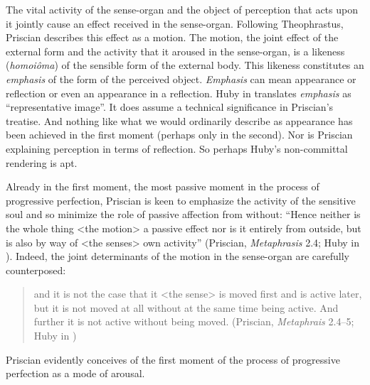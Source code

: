\documentclass[12pt]{article}
\begin{document}
The vital activity of the sense-organ and the object of perception that acts upon it jointly cause an effect received in the sense-organ. Following Theophrastus, Priscian describes this effect as a motion. The motion, the joint effect of the external form and the activity that it aroused in the sense-organ, is a likeness (\emph{homoiôma}) of the sensible form of the external body. This likeness constitutes an \emph{emphasis} of the form of the perceived object. \emph{Emphasis} can mean appearance or reflection or even an appearance in a reflection. Huby in \citet[51 n.25]{Sorabji:1997ly} translates \emph{emphasis} as ``representative image''. It does assume a technical significance in Priscian's treatise. And nothing like what we would ordinarily describe as appearance has been achieved in the first moment (perhaps only in the second). Nor is Priscian explaining perception in terms of reflection. So perhaps Huby's non-committal rendering is apt.

Already in the first moment, the most passive moment in the process of progressive perfection, Priscian is keen to emphasize the activity of the sensitive soul and so minimize the role of passive affection from without: ``Hence neither is the whole thing <the motion> a passive effect nor is it entirely from outside, but is also by way of <the senses> own activity'' (Priscian, \emph{Metaphrasis} 2.4; Huby in \citealt[10]{Sorabji:1997ly}). Indeed, the joint determinants of the motion in the sense-organ are carefully counterposed: 
\begin{quote}
	and it is not the case that it <the sense> is moved first and is active later, but it is not moved at all without at the same time being active. And further it is not active without being moved. (Priscian, \emph{Metaphrais} 2.4--5; Huby in \citealt[10]{Sorabji:1997ly})
\end{quote}
Priscian evidently conceives of the first moment of the process of progressive perfection as a mode of arousal.

\end{document}
